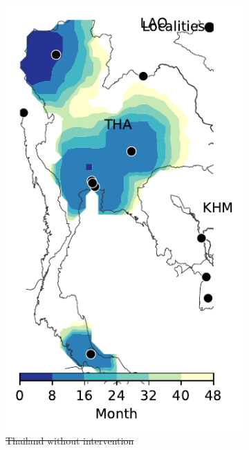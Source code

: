 \documentclass[11pt]{article}
\theoremstyle{definition}
\providecommand{\DIFdeltex}[1]{{\protect\color{red}\sout{#1}}}                      %
\providecommand{\DIFdelFL}[1]{\DIFdel{#1}} %
\providecommand{\DIFaddbeginFL}{} %
\providecommand{\DIFaddendFL}{} %
\providecommand{\DIFdelbeginFL}{} %
\providecommand{\DIFdelendFL}{} %
\providecommand{\DIFdel}[1]{\texorpdfstring{\DIFdeltex{#1}}{}} %
\newcommand{\DIFscaledelfig}{0.5}
\newlength{\DIFdelgraphicswidth} %
\newlength{\DIFdelgraphicsheight} %
\newcommand{\DIFaddincludegraphics}[2][]{{\color{blue}\fbox{\DIFOincludegraphics[#1]{#2}}}} %
\newcommand{\DIFdelincludegraphics}[2][]{%
\sbox{\DIFdelgraphicsbox}{\DIFOincludegraphics[#1]{#2}}%
\settoboxwidth{\DIFdelgraphicswidth}{\DIFdelgraphicsbox} %
\settoboxtotalheight{\DIFdelgraphicsheight}{\DIFdelgraphicsbox} %
\scalebox{\DIFscaledelfig}{%
\parbox[b]{\DIFdelgraphicswidth}{\usebox{\DIFdelgraphicsbox}\\[-\baselineskip] \rule{\DIFdelgraphicswidth}{0em}}\llap{\resizebox{\DIFdelgraphicswidth}{\DIFdelgraphicsheight}{%
\setlength{\unitlength}{\DIFdelgraphicswidth}%
\begin{picture}(1,1)%
\thicklines\linethickness{2pt} %
{\color[rgb]{1,0,0}\put(0,0){\framebox(1,1){}}}%
{\color[rgb]{1,0,0}\put(0,0){\line( 1,1){1}}}%
{\color[rgb]{1,0,0}\put(0,1){\line(1,-1){1}}}%
\end{picture}%
}\hspace*{3pt}}} %
} %
\DeclareRobustCommand{\DIFaddbeginFL}{\DIFOaddbeginFL \let\includegraphics\DIFaddincludegraphics} %
\DeclareRobustCommand{\DIFaddendFL}{\DIFOaddendFL \let\includegraphics\DIFOincludegraphics} %
\DeclareRobustCommand{\DIFdelbeginFL}{\DIFOdelbeginFL \let\includegraphics\DIFdelincludegraphics} %
\DeclareRobustCommand{\DIFdelendFL}{\DIFOaddendFL \let\includegraphics\DIFOincludegraphics} %
\begin{document}
\begin{figure}[ht]
\begin{subfigure}[b]{.135\textwidth}
    \DIFaddendFL \includegraphics[width=\textwidth]{../../cellular_automata/results/contour/TH_model-B_precip1_m1_l3.pdf}
\caption{\DIFdelbeginFL \DIFdelFL{Thailand without intervention}\DIFdelendFL \label{fig:thlBContour}} %
\end{subfigure}
\DIFdelbeginFL %
\DIFdelendFL \DIFaddbeginFL \begin{subfigure}[b]{.135\textwidth}

\end{subfigure}
\end{figure}
\end{document}
